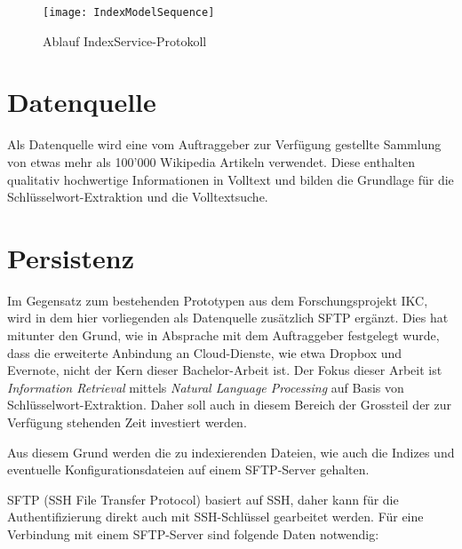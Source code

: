     \begin{figure}[H]
    \centering
    \texttt{[image: IndexModelSequence]}
    \caption{Ablauf IndexService-Protokoll}
    \label{fig:seqindexprotocol}
    \end{figure}
    
\section{Datenquelle}

Als Datenquelle wird eine vom Auftraggeber zur Verfügung gestellte Sammlung von etwas mehr als 100'000 Wikipedia Artikeln verwendet. Diese enthalten qualitativ hochwertige Informationen in Volltext und bilden die Grundlage für die Schlüsselwort-Extraktion und die Volltextsuche.

\section{Persistenz}

Im Gegensatz zum bestehenden Prototypen aus dem Forschungsprojekt \gls{IKC}, wird in dem hier vorliegenden als Datenquelle zusätzlich \gls{SFTP} ergänzt. Dies hat mitunter den Grund, wie in Absprache mit dem Auftraggeber festgelegt wurde, dass die erweiterte Anbindung an Cloud-Dienste, wie etwa Dropbox und Evernote, nicht der Kern dieser Bachelor-Arbeit ist. Der Fokus dieser Arbeit ist \textit{Information Retrieval} mittels \textit{Natural Language Processing} auf Basis von Schlüsselwort-Extraktion. Daher soll auch in diesem Bereich der Grossteil der zur Verfügung stehenden Zeit investiert werden. 

Aus diesem Grund werden die zu indexierenden Dateien, wie auch die Indizes und eventuelle Konfigurationsdateien auf einem \gls{SFTP}-Server gehalten.

\gls{SFTP} (SSH File Transfer Protocol) basiert auf \gls{SSH}, daher kann für die Authentifizierung direkt auch mit \gls{SSH}-Schlüssel gearbeitet werden. Für eine Verbindung mit einem \gls{SFTP}-Server sind folgende Daten notwendig:


